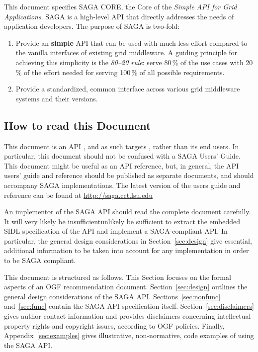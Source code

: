  
  This document specifies SAGA CORE, the Core of the
  \emph{Simple API for Grid Applications}.  SAGA %
  is a high-level API that directly addresses the needs of application
  developers.  The purpose of SAGA is two-fold:
 
  \begin{enumerate}
 
  \item Provide an {\bf simple} API that can be used with much less
    effort compared to the vanilla interfaces of existing grid
    middleware.  A guiding principle for achieving this simplicity is
    the \emph{80--20 rule}: serve 80\,\% of the use cases with 20\,\%
    of the effort needed for serving 100\,\% of all possible
    requirements.
 
  \item Provide a standardized, common interface across various grid
    middleware systems and their versions.
 
  \end{enumerate}
 
  \subsection{How to read this Document}
 
  This document is an API , and as such targets
   , rather than its end users.
  In particular, this document should not be confused with a SAGA
  Users' Guide.  This document might be useful as an API reference,
  but, in general, the API users' guide and reference should be
  published as separate documents, and should accompany SAGA
  implementations. The latest version of the users guide and
    reference can be found at \url{http://saga.cct.lsu.edu}
   
  An implementor of the SAGA API should read the complete document
  carefully. It will very likely be insufficient{unlikely be
    sufficient} to extract the embedded SIDL specification of the API
  and implement a SAGA-compliant API. In particular,
  the general design considerations in Section~\ref{sec:design} give
  essential, additional information to be taken into account for any
  implementation in order to be SAGA
  compliant.
 
   This document is structured as follows. This Section
   focuses on the formal aspects of an OGF
   recommendation document.  Section~\ref{sec:design} outlines
   the general design considerations of the SAGA API.
   Sections~\ref{sec:nonfunc} and~\ref{sec:func} contain the
   SAGA API specification itself. Section~\ref{sec:disclaimers}
   gives author contact information and provides disclaimers
   concerning intellectual property rights and copyright issues,
   according to OGF policies.  Finally,
   Appendix~\ref{sec:examples} gives illustrative,
   non-normative, code examples of using the SAGA API.
 
